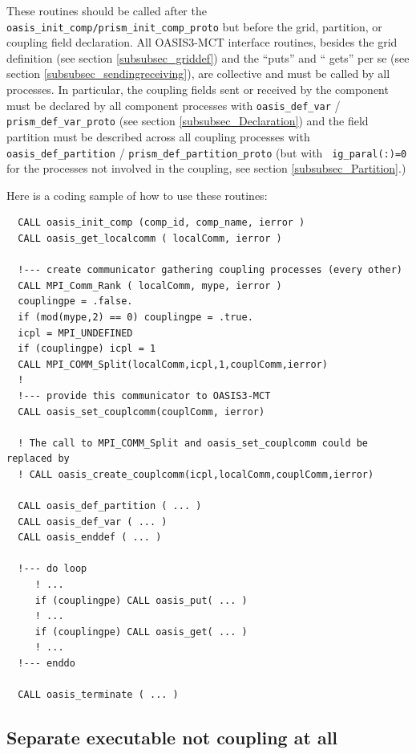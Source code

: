 These routines should be called after the {\tt oasis\_init\_comp/prism\_init\_comp\_proto}
but before the grid, partition, or coupling field declaration.
All OASIS3-MCT interface routines, besides the grid definition (see
section \ref{subsubsec_griddef}) and the ``puts'' and `` gets'' per se
(see section \ref{subsubsec_sendingreceiving}), are collective and
must be called by all processes.
In particular, the
coupling fields sent or received by the component must be declared by
all component processes
with {\tt oasis\_def\_var} / {\tt prism\_def\_var\_proto} (see section \ref{subsubsec_Declaration})
and the field partition must be described across all coupling
processes with {\tt oasis\_def\_partition} / {\tt prism\_def\_partition\_proto} (but with {\tt
  ig\_paral(:)=0} for the processes not involved in the coupling, see
section \ref{subsubsec_Partition}.) 

Here is a coding sample of how to use these routines:
 
\begin{verbatim}
  CALL oasis_init_comp (comp_id, comp_name, ierror )
  CALL oasis_get_localcomm ( localComm, ierror )

  !--- create communicator gathering coupling processes (every other)
  CALL MPI_Comm_Rank ( localComm, mype, ierror )
  couplingpe = .false.
  if (mod(mype,2) == 0) couplingpe = .true. 
  icpl = MPI_UNDEFINED
  if (couplingpe) icpl = 1
  CALL MPI_COMM_Split(localComm,icpl,1,couplComm,ierror)
  !
  !--- provide this communicator to OASIS3-MCT
  CALL oasis_set_couplcomm(couplComm, ierror)
  
  ! The call to MPI_COMM_Split and oasis_set_couplcomm could be replaced by 
  ! CALL oasis_create_couplcomm(icpl,localComm,couplComm,ierror)

  CALL oasis_def_partition ( ... )
  CALL oasis_def_var ( ... )
  CALL oasis_enddef ( ... )

  !--- do loop
     ! ...
     if (couplingpe) CALL oasis_put( ... )
     ! ...
     if (couplingpe) CALL oasis_get( ... )
     ! ...
  !--- enddo

  CALL oasis_terminate ( ... )
\end{verbatim}

\subsection{Separate executable not coupling at all}
\label{subsec_nocpl}

